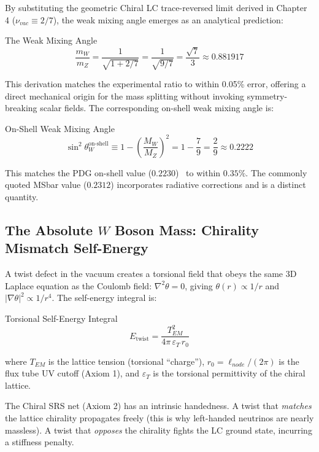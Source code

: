 By substituting the geometric Chiral LC trace-reversed limit derived in Chapter 4 ($\nu_{vac} \equiv 2/7$), the weak mixing angle emerges as an analytical prediction:

\begin{resultbox}{The Weak Mixing Angle}
\begin{equation}
\frac{m_W}{m_Z} = \frac{1}{\sqrt{1+2/7}} = \frac{1}{\sqrt{9/7}} = \frac{\sqrt{7}}{3} \approx 0.881917
\end{equation}
\end{resultbox}

This derivation matches the experimental ratio to within 0.05\% error, offering a direct mechanical origin for the mass splitting without invoking symmetry-breaking scalar fields. The corresponding on-shell weak mixing angle is:
\begin{resultbox}{On-Shell Weak Mixing Angle}
\begin{equation}
    \sin^2\theta_W^{\text{on-shell}} \equiv 1 - \left(\frac{M_W}{M_Z}\right)^2 = 1 - \frac{7}{9} = \frac{2}{9} \approx 0.2222
\end{equation}
\end{resultbox}
This matches the PDG on-shell value ($0.2230$)~\cite{pdg2022} to within $0.35\%$. The commonly quoted MSbar value ($0.2312$) incorporates radiative corrections and is a distinct quantity.

\subsection{The Absolute $W$ Boson Mass: Chirality Mismatch Self-Energy}

A twist defect in the vacuum creates a torsional field that obeys the same 3D Laplace equation as the Coulomb field: $\nabla^2\theta = 0$, giving $\theta(r) \propto 1/r$ and $|\nabla\theta|^2 \propto 1/r^4$. The self-energy integral is:
\begin{resultbox}{Torsional Self-Energy Integral}
\begin{equation}
    E_{\text{twist}} = \frac{T_{EM}^2}{4\pi\,\varepsilon_T\, r_0}
\end{equation}
\end{resultbox}
where $T_{EM}$ is the lattice tension (torsional ``charge''), $r_0 = \ell_{node}/(2\pi)$ is the flux tube UV cutoff (Axiom 1), and $\varepsilon_T$ is the torsional permittivity of the chiral lattice.

The Chiral SRS net (Axiom 2) has an intrinsic handedness. A twist that \emph{matches} the lattice chirality propagates freely (this is why left-handed neutrinos are nearly massless). A twist that \emph{opposes} the chirality fights the LC ground state, incurring a stiffness penalty.

